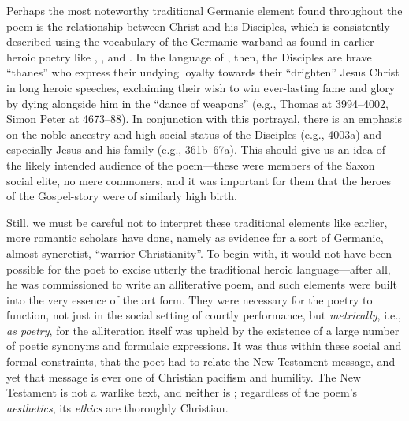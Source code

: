 Perhaps the most noteworthy traditional Germanic element found throughout the poem is the relationship between Christ and his Disciples, which is consistently described using the vocabulary of the Germanic warband as found in earlier heroic poetry like \Beowulf, \Finnsburg, and .
In the language of \Heliand, then, the Disciples are brave “thanes” who express their undying loyalty towards their “drighten” Jesus Christ in long heroic speeches, exclaiming their wish to win ever-lasting fame and glory by dying alongside him in the “dance of weapons” (e.g., Thomas at 3994--4002, Simon Peter at 4673--88).  In conjunction with this portrayal, there is an emphasis on the noble ancestry and high social status of the Disciples (e.g., 4003a) and especially Jesus and his family (e.g., 361b--67a).  This should give us an idea of the likely intended audience of the poem---these were members of the Saxon social elite, no mere commoners, and it was important for them that the heroes of the Gospel-story were of similarly high birth.

Still, we must be careful not to interpret these traditional elements like earlier, more romantic scholars have done, namely as evidence for a sort of Germanic, almost syncretist, “warrior Christianity”.  To begin with, it would not have been possible for the poet to excise utterly the traditional heroic language---after all, he was commissioned to write an alliterative poem, and such elements were built into the very essence of the art form.  They were necessary for the poetry to function, not just in the social setting of courtly performance, but \emph{metrically}, i.e., \emph{as poetry}, for the alliteration itself was upheld by the existence of a large number of poetic synonyms and formulaic expressions.  It was thus within these social and formal constraints, that the poet had to relate the New Testament message, and yet that message is ever one of Christian pacifism and humility.  The New Testament is not a warlike text, and neither is ; regardless of the poem’s \emph{aesthetics}, its \emph{ethics} are thoroughly Christian.

